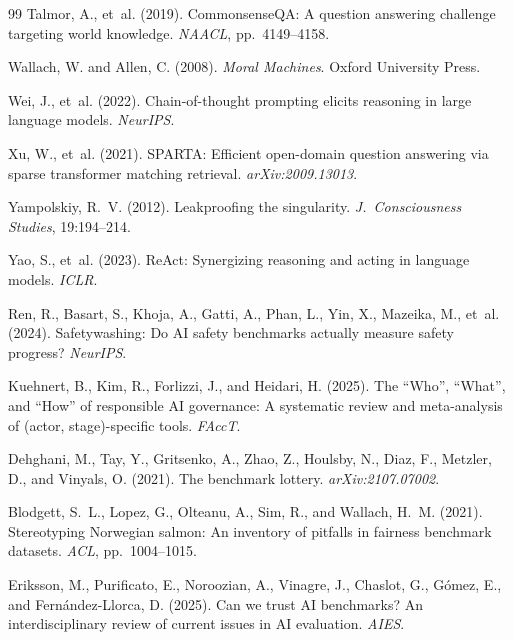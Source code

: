 \documentclass[11pt]{article}
\begin{document}
\begin{thebibliography}{99}
Talmor, A., et~al. (2019). CommonsenseQA: A question answering challenge targeting world knowledge. \textit{NAACL}, pp.~4149--4158.

Wallach, W. and Allen, C. (2008). \textit{Moral Machines}. Oxford University Press.

Wei, J., et~al. (2022). Chain-of-thought prompting elicits reasoning in large language models. \textit{NeurIPS}.

Xu, W., et~al. (2021). SPARTA: Efficient open-domain question answering via sparse transformer matching retrieval. \textit{arXiv:2009.13013}.

Yampolskiy, R.~V. (2012). Leakproofing the singularity. \textit{J.~Consciousness Studies}, 19:194--214.

Yao, S., et~al. (2023). ReAct: Synergizing reasoning and acting in language models. \textit{ICLR}.


Ren, R., Basart, S., Khoja, A., Gatti, A., Phan, L., Yin, X., Mazeika, M., et~al. (2024). Safetywashing: Do AI safety benchmarks actually measure safety progress? \textit{NeurIPS}.

Kuehnert, B., Kim, R., Forlizzi, J., and Heidari, H. (2025). The ``Who'', ``What'', and ``How'' of responsible AI governance: A systematic review and meta-analysis of (actor, stage)-specific tools. \textit{FAccT}.

Dehghani, M., Tay, Y., Gritsenko, A., Zhao, Z., Houlsby, N., Diaz, F., Metzler, D., and Vinyals, O. (2021). The benchmark lottery. \textit{arXiv:2107.07002}.

Blodgett, S.~L., Lopez, G., Olteanu, A., Sim, R., and Wallach, H.~M. (2021). Stereotyping Norwegian salmon: An inventory of pitfalls in fairness benchmark datasets. \textit{ACL}, pp.~1004--1015.

Eriksson, M., Purificato, E., Noroozian, A., Vinagre, J., Chaslot, G., G\'{o}mez, E., and Fern\'{a}ndez-Llorca, D. (2025). Can we trust AI benchmarks? An interdisciplinary review of current issues in AI evaluation. \textit{AIES}.


\end{thebibliography}
\end{document}
